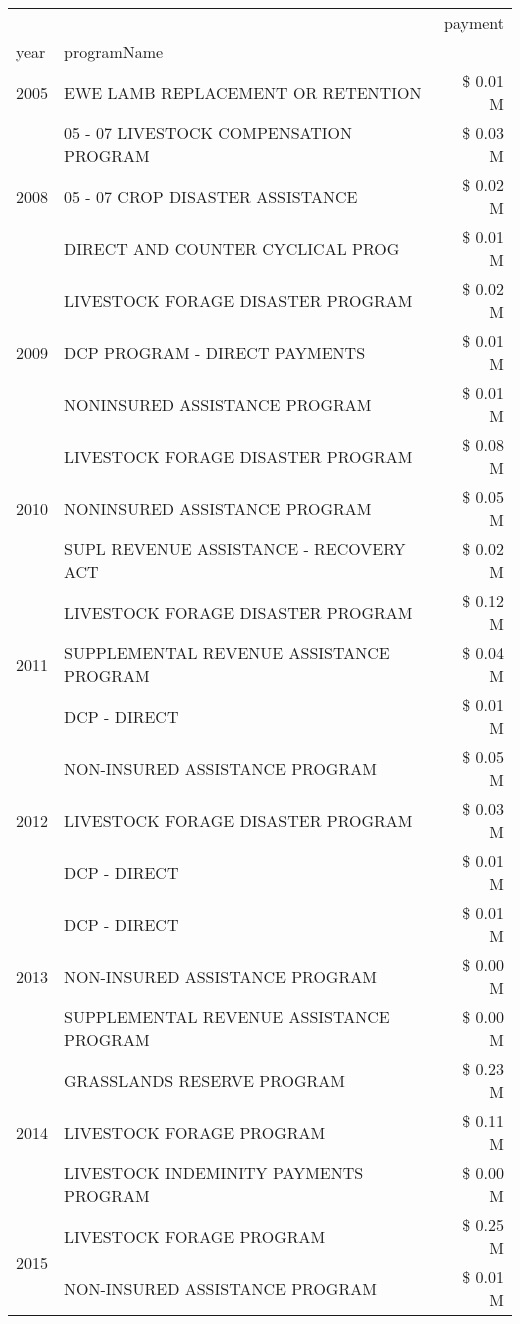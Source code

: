 \begin{tabular}{llr}
\toprule
 &  & payment \\
year & programName &  \\
\midrule
2005 & EWE LAMB REPLACEMENT OR RETENTION & \$ 0.01 M \\
\cline{1-3}
\multirow[t]{3}{*}{2008} & 05 - 07 LIVESTOCK COMPENSATION PROGRAM & \$ 0.03 M \\
 & 05 - 07 CROP DISASTER ASSISTANCE & \$ 0.02 M \\
 & DIRECT AND COUNTER CYCLICAL PROG & \$ 0.01 M \\
\cline{1-3}
\multirow[t]{3}{*}{2009} & LIVESTOCK FORAGE DISASTER  PROGRAM & \$ 0.02 M \\
 & DCP PROGRAM - DIRECT PAYMENTS & \$ 0.01 M \\
 & NONINSURED ASSISTANCE PROGRAM & \$ 0.01 M \\
\cline{1-3}
\multirow[t]{3}{*}{2010} & LIVESTOCK FORAGE DISASTER PROGRAM & \$ 0.08 M \\
 & NONINSURED ASSISTANCE PROGRAM & \$ 0.05 M \\
 & SUPL REVENUE ASSISTANCE - RECOVERY ACT & \$ 0.02 M \\
\cline{1-3}
\multirow[t]{3}{*}{2011} & LIVESTOCK FORAGE DISASTER PROGRAM & \$ 0.12 M \\
 & SUPPLEMENTAL REVENUE ASSISTANCE PROGRAM & \$ 0.04 M \\
 & DCP - DIRECT & \$ 0.01 M \\
\cline{1-3}
\multirow[t]{3}{*}{2012} & NON-INSURED ASSISTANCE PROGRAM & \$ 0.05 M \\
 & LIVESTOCK FORAGE DISASTER PROGRAM & \$ 0.03 M \\
 & DCP - DIRECT & \$ 0.01 M \\
\cline{1-3}
\multirow[t]{3}{*}{2013} & DCP - DIRECT & \$ 0.01 M \\
 & NON-INSURED ASSISTANCE PROGRAM & \$ 0.00 M \\
 & SUPPLEMENTAL REVENUE ASSISTANCE PROGRAM & \$ 0.00 M \\
\cline{1-3}
\multirow[t]{3}{*}{2014} & GRASSLANDS RESERVE PROGRAM & \$ 0.23 M \\
 & LIVESTOCK FORAGE PROGRAM & \$ 0.11 M \\
 & LIVESTOCK INDEMINITY PAYMENTS PROGRAM & \$ 0.00 M \\
\cline{1-3}
\multirow[t]{2}{*}{2015} & LIVESTOCK FORAGE PROGRAM & \$ 0.25 M \\
 & NON-INSURED ASSISTANCE PROGRAM & \$ 0.01 M \\

\end{tabular}
